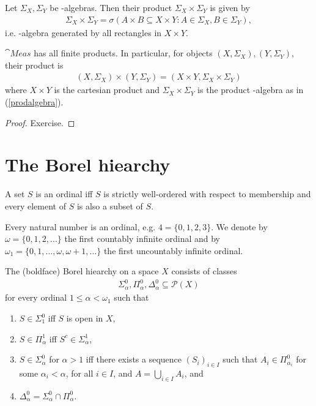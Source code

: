 \documentclass{article}
\begin{document}
\begin{definition}
	Let $\Sigma_X,\Sigma_Y$ be \sigma-algebras. Then their product $\Sigma_X\times\Sigma_Y$ is given by
	\begin{align}
		\label{prodalgebra}
		\Sigma_X\times\Sigma_Y=\sigma\left(A\times B\subseteq X\times Y : A\in\Sigma_X,B\in\Sigma_Y\right),
	\end{align}
	i.e. \sigma-algebra generated by all rectangles in $X\times Y$.
\end{definition}

\begin{proposition}
	$\cat{Meas}$ has all finite products. In particular, for objects $(X,\Sigma_X),(Y,\Sigma_Y)$,
	their product is
	\begin{align*}
		(X,\Sigma_X)\times(Y,\Sigma_Y)=(X\times Y,\Sigma_X\times\Sigma_Y)
	\end{align*}
	where $X\times Y$ is the cartesian product and $\Sigma_X\times\Sigma_Y$ is the product \sigma-algebra
	as in (\ref{prodalgebra}).
	\begin{proof}
		Exercise.
	\end{proof}
\end{proposition}


\section{The Borel hiearchy}

\begin{definition}
	A set $S$ is an ordinal iff $S$ is strictly well-ordered with respect to membership and every
	element of $S$ is also a subset of $S$.

	Every natural number is an ordinal, e.g. $4=\{0,1,2,3\}$. We denote by $\omega=\{0,1,2,...\}$ the first countably
	infinite ordinal and by $\omega_1=\{0,1,...,\omega,\omega+1,...\}$ the first uncountably infinite ordinal.
\end{definition}

\begin{definition}
	The (boldface) Borel hiearchy on a space $X$ consists of classes
	\begin{align*}
		\Sigma_\alpha^0,\Pi_\alpha^0,\Delta_\alpha^0\subseteq\mathcal{P}(X)
	\end{align*}
	for every ordinal $1\leq\alpha<\omega_1$ such that
	\begin{enumerate}
		\item $S\in\Sigma_1^0$ iff $S$ is open in $X$,
		\item $S\in\Pi_\alpha^1$ iff $S^c\in\Sigma_\alpha^1$,
		\item $S\in\Sigma_\alpha^0$ for $\alpha>1$ iff there exists a sequence $(S_i)_{i\in I}$ such that
		      $A_i\in\Pi_{\alpha_i}^0$ for some $\alpha_i<\alpha$, for all $i\in I$, and $A=\bigcup_{i\in I} A_i$, and
		\item $\Delta_\alpha^0=\Sigma_\alpha^0\cap\Pi^0_\alpha$.
	\end{enumerate}
\end{definition}
\end{document}
